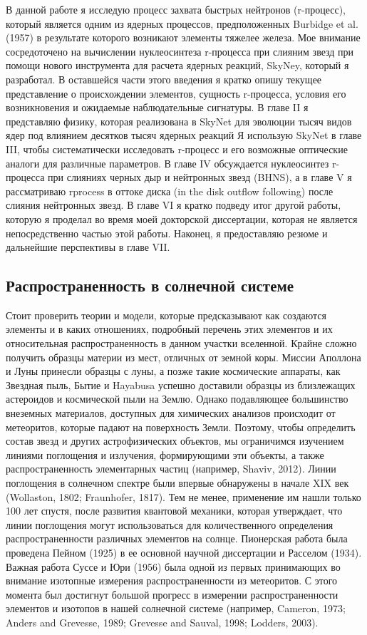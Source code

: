 \documentclass[%
bachelor,    %
natbib,      %
subf,        %
href,        %
colorlinks,  %
]{disser}
\begin{document}
В данной работе я исследую процесс захвата быстрых нейтронов (r-процесс), который является одним из ядерных процессов, предположенных Burbidge et al. (1957) в результате которого возникают элементы тяжелее железа. Мое внимание сосредоточено на вычислении нуклеосинтеза r-процесса при слияним звезд при помощи нового инструмента для расчета ядерных реакций, SkyNey, который я разработал. В оставшейся части этого введения я кратко опишу текущее представление о происхождении элементов, сущность r-процесса, условия его возникновения и ожидаемые наблюдательные сигнатуры. В главе II я представляю физику, которая реализована в SkyNet для эволюции тысяч видов ядер под влиянием десятков тысяч ядерных реакций Я использую SkyNet в главе III, чтобы систематически исследовать r-процесс и его возможные оптические аналоги для различные параметров. В главе IV обсуждается нуклеосинтез r-процесса при слияниях черных дыр и нейтронных звезд (BHNS), а в главе V я рассматриваю rprocess
в оттоке диска (in the disk outflow following) после слияния нейтронных звезд. В главе VI я кратко подведу итог другой работы, которую я проделал во время моей докторской диссертации, которая не является непосредственно частью этой работы. Наконец, я предоставляю резюме и дальнейшие перспективы в главе VII.

\subsection{Распространенность в солнечной системе}
Стоит проверить теории и модели, которые предсказывают как создаются элементы и в каких отношениях, подробный перечень этих элементов и их относительная распространенность в данном участки вселенной. Крайне сложно получить образцы материи из мест, отличных от земной коры. Миссии Аполлона и Луны принесли образцы с луны, а позже такие космические аппараты, как Звездная пыль, Бытие и Hayabusa успешно доставили образцы из близлежащих астероидов и космической пыли на Землю. Однако подавляющее большинство внеземных материалов, доступных для химических анализов происходит от метеоритов, которые падают на поверхность Земли. Поэтому, чтобы определить состав звезд и других астрофизических объектов, мы ограничимся изучением линиями поглощения и излучения, формирующими эти объекты, а также распространенность элементарных частиц (например, Shaviv, 2012). Линии поглощения в солнечном спектре были впервые обнаружены в начале XIX век (Wollaston, 1802; Fraunhofer, 1817). Тем не менее, применение им нашли только 100 лет спустя, после развития квантовой механики, которая утверждает, что линии поглощения могут использоваться для количественного определения распространенности различных элементов на солнце. Пионерская работа была проведена Пейном (1925) в ее основной научной диссертации и Расселом (1934). Важная работа Суссе и Юри (1956) была одной из первых принимающих во внимание изотопные измерения распространенности из метеоритов. С этого момента был достигнут большой прогресс в измерении распространенности элементов и изотопов в нашей солнечной системе (например, Cameron, 1973; Anders and Grevesse, 1989; Grevesse and Sauval, 1998; Lodders, 2003).
\end{document}

